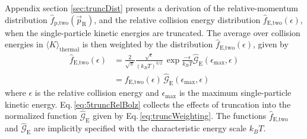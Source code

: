 Appendix section \ref{sec:truncDist} presents a derivation of the relative-momentum distribution $\hat{f}_\text{p,two}(\vec{p}_\text{R})$, and the relative collision energy distribution $\hat{f}_\text{E,two}(\epsilon)$, when the single-particle kinetic energies are truncated.
The average over collision energies in $\langle K \rangle_\text{thermal}$ is then weighted by the distribution $\hat{f}_\text{E,two}(\epsilon)$, given by
\begin{align} \label{eq:5truncRelBolz}
	\hat{f}_\text{E,two}(\epsilon) &= \frac{2}{\sqrt{\pi}} \frac{\sqrt{\epsilon}}{(k_B T)^{3/2}} \, \exp{\frac{-\epsilon}{k_B T}} \hat{\mathcal{G}}_\text{E}(\epsilon_\text{max},\epsilon) \\
	\nonumber
								   &= f_\text{E,two}(\epsilon) \, \hat{\mathcal{G}}_\text{E}(\epsilon_\text{max},\epsilon)
\end{align}
where $\epsilon$ is the relative collision energy and $\epsilon_\text{max}$ is the maximum single-particle kinetic energy.
Eq.\,\ref{eq:5truncRelBolz} collects the effects of truncation into the normalized function $\hat{\mathcal{G}}_\text{E}$ given by Eq.\,\ref{eq:truncWeighting}.
The functions $\hat{f}_\text{E,two}$ and $\hat{\mathcal{G}}_\text{E}$ are implicitly specified with the characteristic energy scale $k_B T$.

